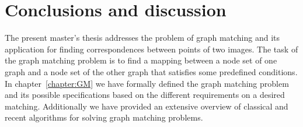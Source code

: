 \chapter{Conclusions and discussion} \label{chapter:conclusions}

The present master's thesis addresses the problem of graph matching and its application for finding correspondences between points of two images. The task of the graph matching problem is to find a mapping between a node set of one graph and a node set of the other graph that satisfies some predefined conditions. In chapter~\ref{chapter:GM} we have formally defined the graph matching problem and its possible specifications based on the different requirements on a desired matching. Additionally we have provided an extensive overview of classical and recent algorithms for solving graph matching problems. 

